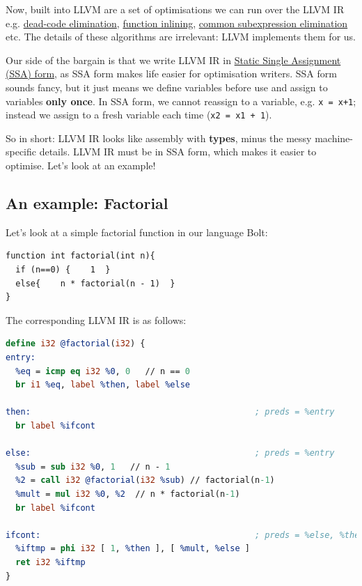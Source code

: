 Now, built into LLVM are a set of optimisations we can run over the LLVM
IR e.g.
\href{https://en.wikipedia.org/wiki/Dead_code_elimination}{dead-code
elimination},
\href{https://en.wikipedia.org/wiki/Inline_expansion}{function
inlining},
\href{https://cran.r-project.org/web/packages/rco/vignettes/opt-common-subexpr.html}{common
subexpression elimination} etc. The details of these algorithms are
irrelevant: LLVM implements them for us.

Our side of the bargain is that we write LLVM IR in
\href{https://en.wikipedia.org/wiki/Static_single_assignment_form}{Static
Single Assignment (SSA) form}, as SSA form makes life easier for
optimisation writers. SSA form sounds fancy, but it just means we define
variables before use and assign to variables \textbf{only once}. In SSA
form, we cannot reassign to a variable, e.g. \texttt{x\ =\ x+1}; instead
we assign to a fresh variable each time (\texttt{x2\ =\ x1\ +\ 1}).

So in short: LLVM IR looks like assembly with \textbf{types}, minus the
messy machine-specific details. LLVM IR must be in SSA form, which makes
it easier to optimise. Let's look at an example!

\hypertarget{an-example-factorial}{%
\subsection{\texorpdfstring{\protect\hyperlink{an-example-factorial}{}An
example: Factorial}{An example: Factorial}}\label{an-example-factorial}}

Let's look at a simple factorial function in our language Bolt:




\begin{lstlisting}[caption={{factorial.bolt}}]
function int factorial(int n){
  if (n==0) {    1  }
  else{    n * factorial(n - 1)  }
}
\end{lstlisting}

The corresponding LLVM IR is as follows:




\begin{lstlisting}[caption={{factorial.ll}},language=llvm]
define i32 @factorial(i32) {
entry:
  %eq = icmp eq i32 %0, 0   // n == 0
  br i1 %eq, label %then, label %else

then:                                             ; preds = %entry
  br label %ifcont

else:                                             ; preds = %entry
  %sub = sub i32 %0, 1   // n - 1
  %2 = call i32 @factorial(i32 %sub) // factorial(n-1)
  %mult = mul i32 %0, %2  // n * factorial(n-1)
  br label %ifcont

ifcont:                                           ; preds = %else, %then
  %iftmp = phi i32 [ 1, %then ], [ %mult, %else ]
  ret i32 %iftmp
}
\end{lstlisting}

